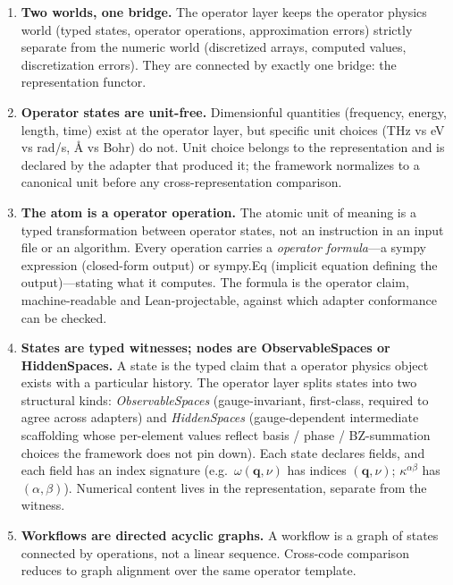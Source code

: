 \documentclass[11pt,a4paper]{article}
\begin{document}
\begin{enumerate}[leftmargin=2.5em, itemsep=0.4em]
  \item \textbf{Two worlds, one bridge.} The operator layer keeps the operator physics world
        (typed states, operator operations, approximation errors) strictly separate from
        the numeric world (discretized arrays, computed values, discretization errors).
        They are connected by exactly one bridge: the representation functor.

  \item \textbf{Operator states are unit-free.} Dimensionful quantities (frequency,
        energy, length, time) exist at the operator layer, but specific unit choices
        (THz vs eV vs rad/s, \AA{} vs Bohr) do not. Unit choice belongs to the
        representation and is declared by the adapter that produced it; the framework
        normalizes to a canonical unit before any cross-representation comparison.

  \item \textbf{The atom is a operator operation.} The atomic unit of meaning is a typed
        transformation between operator states, not an instruction in an input file or an
        algorithm. Every operation carries a \emph{operator formula}---a sympy expression
        (closed-form output) or sympy.Eq (implicit equation defining the output)---stating
        what it computes. The formula is the operator claim, machine-readable and
        Lean-projectable, against which adapter conformance can be checked.

  \item \textbf{States are typed witnesses; nodes are ObservableSpaces or HiddenSpaces.}
        A state is the typed claim that a operator physics object exists with a
        particular history. The operator layer splits states into two structural kinds:
        \emph{ObservableSpaces} (gauge-invariant, first-class, required to agree across
        adapters) and \emph{HiddenSpaces} (gauge-dependent intermediate scaffolding
        whose per-element values reflect basis / phase / BZ-summation choices the
        framework does not pin down). Each state declares fields, and each field has an
        index signature (e.g.\ $\omega(\mathbf{q},\nu)$ has indices $(\mathbf{q}, \nu)$;
        $\kappa^{\alpha\beta}$ has $(\alpha, \beta)$). Numerical content lives in the
        representation, separate from the witness.

  \item \textbf{Workflows are directed acyclic graphs.} A workflow is a graph of states
        connected by operations, not a linear sequence. Cross-code comparison reduces
        to graph alignment over the same operator template.


\end{enumerate}
\end{document}
